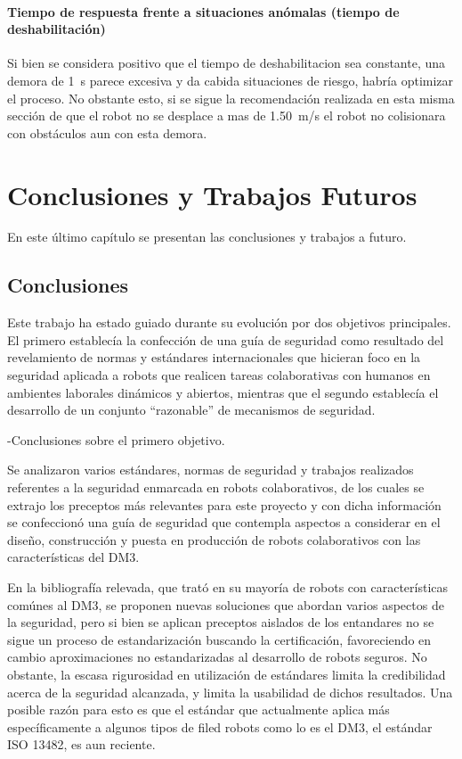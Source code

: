 \documentclass[withindex,glossary]{cam-thesis}
\begin{document}
\subsubsection{Tiempo de respuesta frente a situaciones anómalas (tiempo de deshabilitación)}
Si bien se considera positivo que el tiempo de deshabilitacion sea constante, una demora de \SI{1}{\second} parece excesiva y da cabida situaciones de riesgo, habría optimizar el proceso. No obstante esto, si se sigue la recomendación realizada en esta misma sección de que el robot no se desplace a mas de \SI{1.50}{\metre/\second} el robot no colisionara con obstáculos aun con esta demora.

\chapter{Conclusiones y Trabajos Futuros}

En este último capítulo se presentan las conclusiones y trabajos a futuro.

\section{Conclusiones}
Este trabajo ha estado guiado durante su evolución por dos objetivos principales. El primero establecía la confección de una guía de seguridad como resultado del revelamiento de normas y estándares internacionales que hicieran foco en la seguridad aplicada a robots que realicen tareas colaborativas con humanos en ambientes laborales dinámicos y abiertos, mientras que el segundo establecía el desarrollo de un conjunto ``razonable'' de mecanismos de seguridad.

-Conclusiones sobre el primero objetivo.

Se analizaron varios estándares, normas de seguridad y trabajos realizados referentes a la seguridad enmarcada en robots colaborativos, de los cuales se extrajo los preceptos más relevantes para este proyecto y con dicha información se confeccionó una guía de seguridad que contempla aspectos a considerar en el diseño, construcción y puesta en producción de robots colaborativos con las características del DM3.

En la bibliografía relevada, que trató en su mayoría de robots con características comúnes al DM3, se proponen nuevas soluciones que abordan varios aspectos de la seguridad, pero si bien se aplican preceptos aislados de los entandares no se sigue un proceso de estandarización buscando la certificación, favoreciendo en cambio aproximaciones no estandarizadas al desarrollo de robots seguros. No obstante, la escasa rigurosidad en utilización de estándares limita la credibilidad acerca de la seguridad alcanzada, y limita la usabilidad de dichos resultados. Una posible razón para esto es que el estándar que actualmente aplica más específicamente a algunos tipos de filed robots como lo es el DM3, el estándar ISO 13482, es aun reciente.
\end{document}
